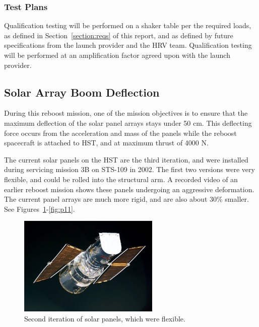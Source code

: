 \documentclass[paper=letter, fontsize=11pt]{scrartcl} %
\numberwithin{equation}{section} %
\numberwithin{figure}{section} %
\numberwithin{table}{section} %
\begin{document}
\subsubsection{Test Plans}
Qualification testing will be performed on a shaker table per the required loads, as defined in Section~\ref{section:reqs} of this report, and as defined by future specifications from the launch provider and the HRV team. Qualification testing will be performed at an amplification factor agreed upon with the launch provider.

\subsection{Solar Array Boom Deflection}

During this reboost mission, one of the mission objectives is to ensure that the maximum deflection of the solar panel arrays stays under 50 cm. This deflecting force occurs from the acceleration and mass of the panels while the reboost spacecraft is attached to HST, and at maximum thrust of 4000 N.

The current solar panels on the HST are the third iteration, and were installed during servicing mission 3B on STS-109 in 2002. The first two versions were very flexible, and could be rolled into the structural arm. A recorded video of an earlier reboost mission shows these panels undergoing an aggressive deformation. The current panel arrays are much more rigid, and are also about 30\% smaller. See Figures~\ref{fig:p9}-\ref{fig:p11}.

\begin{figure}[H]
    \begin{center}
        \includegraphics[width=0.6\textwidth]{Pics/9.png}
        \caption{Second iteration of solar panels, which were flexible.}
        \label{fig:p9}
    \end{center}
\end{figure}
\end{document}
